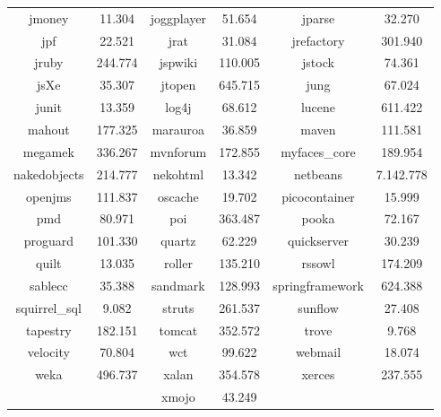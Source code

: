 \begin{table}
\begin{tabularx}{\textwidth}{c|c||c|c||C|c}
		jmoney & 11.304 & joggplayer & 51.654 & jparse & 32.270 \\
		jpf & 22.521 & jrat & 31.084 & jrefactory & 301.940 \\
		jruby & 244.774 & jspwiki & 110.005 & jstock & 74.361 \\
		jsXe & 35.307 & jtopen & 645.715 & jung & 67.024 \\
		junit & 13.359 & log4j & 68.612 & lucene & 611.422 \\
		mahout & 177.325 & marauroa & 36.859 & maven & 111.581 \\
		megamek & 336.267 & mvnforum & 172.855 & myfaces\_core & 189.954 \\
		nakedobjects & 214.777 & nekohtml & 13.342 & netbeans & 7.142.778 \\
		openjms & 111.837 & oscache & 19.702 & picocontainer & 15.999 \\
		pmd & 80.971 & poi & 363.487 & pooka & 72.167 \\
		proguard & 101.330 & quartz & 62.229 & quickserver & 30.239 \\
		quilt & 13.035 & roller & 135.210 & rssowl & 174.209 \\
		sablecc & 35.388 & sandmark & 128.993 & springframework & 624.388 \\
		squirrel\_sql & 9.082 & struts & 261.537 & sunflow & 27.408 \\
		tapestry & 182.151 & tomcat & 352.572 & trove & 9.768 \\
		velocity & 70.804 & wct & 99.622 & webmail & 18.074 \\
		weka & 496.737 & xalan & 354.578 & xerces & 237.555 \\
		& & xmojo & 43.249 & &
	\end{tabularx}
\end{table}
\setlength{\extrarowheight}{0em}